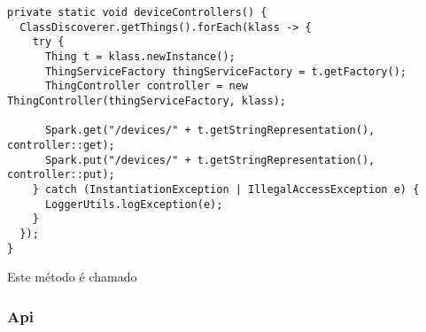 \begin{verbatim}
private static void deviceControllers() {
  ClassDiscoverer.getThings().forEach(klass -> {
    try {
      Thing t = klass.newInstance();
      ThingServiceFactory thingServiceFactory = t.getFactory();
      ThingController controller = new ThingController(thingServiceFactory, klass);

      Spark.get("/devices/" + t.getStringRepresentation(), controller::get);
      Spark.put("/devices/" + t.getStringRepresentation(), controller::put);
    } catch (InstantiationException | IllegalAccessException e) {
      LoggerUtils.logException(e);
    }
  });
}
\end{verbatim}

Este método é chamado

\subsubsection{Api}